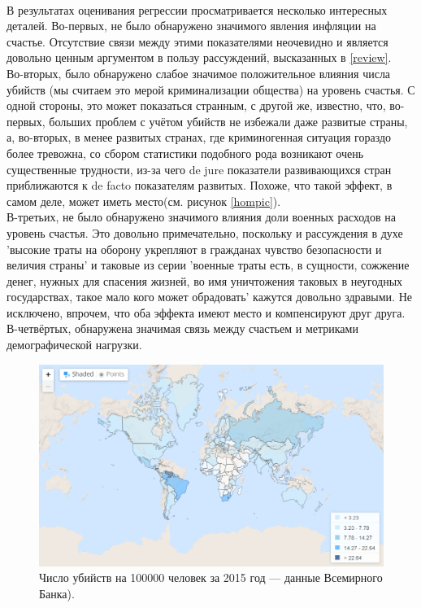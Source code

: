 \documentclass[russian]{vegareport}
\begin{document}
        \\
        В результатах оценивания регрессии просматривается несколько интересных деталей. Во-первых, не было обнаружено значимого явления инфляции на счастье. Отсутствие связи между этими показателями неочевидно и является довольно ценным аргументом в пользу рассуждений, высказанных в \ref{review}.
        \\
        Во-вторых, было обнаружено слабое значимое положительное влияния числа убийств (мы считаем это мерой криминализации общества) на уровень счастья. С одной стороны, это может показаться странным, с другой же, известно, что, во-первых, больших проблем с учётом убийств не избежали даже развитые страны, а, во-вторых, в менее развитых странах, где криминогенная ситуация гораздо более тревожна, со сбором статистики подобного рода возникают очень существенные трудности, из-за чего de jure показатели развивающихся стран приближаются к de facto показателям развитых. Похоже, что такой эффект, в самом деле, может иметь место(см. рисунок \ref{hompic}).
        \\
        В-третьих, не было обнаружено значимого влияния доли военных расходов на уровень счастья. Это довольно примечательно, поскольку и рассуждения в духе 'высокие траты на оборону укрепляют в гражданах чувство безопасности и величия страны' и таковые из серии 'военные траты есть, в сущности, сожжение денег, нужных для спасения жизней, во имя уничтожения таковых в неугодных государствах, такое мало кого может обрадовать' кажутся довольно здравыми. Не исключено, впрочем, что оба эффекта имеют место и компенсируют друг друга.
        \\
        В-четвёртых, обнаружена значимая связь между счастьем и метриками демографической нагрузки. 
        \begin{figure} \label{hompic}
            \centering
            \includegraphics[scale=0.45]{homicides.png}
            \caption{Число убийств на 100000 человек за 2015 год --- данные Всемирного Банка).}
            \label{lect02:pic1}
        \end{figure}
\end{document}
